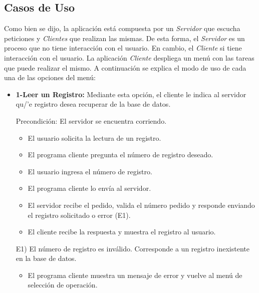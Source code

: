 \documentclass[a4paper,10pt]{article}
\begin{document}
			\subsection{Casos de Uso}

			Como bien se dijo, la aplicaci\'on est\'a compuesta por un \emph{Servidor} que escucha peticiones y \emph{Clientes} que realizan las mismas. 
			De esta forma, el \emph{Servidor} es un proceso que no tiene interacci\'on con el usuario. En cambio, el \emph{Cliente} si tiene interacci\'on
			con el usuario. La aplicaci\'on \emph{Cliente} despliega un men\'u con las tareas que puede realizar el mismo. A continuaci\'on se 
			explica el modo de uso de cada una de las opciones del men\'u: 

			\begin{itemize}
                                
                \item \textbf{1-Leer un Registro:} Mediante esta opci\'on, el cliente le indica al servidor qu/'e registro desea recuperar de la base de datos.

                Precondici\'on: El servidor se encuentra corriendo. 
                \begin{itemize}
                    \item El usuario solicita la lectura de un registro. 
                    \item El programa cliente pregunta el n\'umero de registro deseado. 
		    \item El usuario ingresa el n\'umero de registro. 
                    \item El programa cliente lo env\'ia al servidor.
                    \item El servidor recibe el pedido, valida el n\'umero pedido y responde enviando el registro solicitado o error (E1). 
		    \item El cliente recibe la respuesta y muestra el registro al usuario.
                \end{itemize}
                
                E1) El n\'umero de registro es inv\'alido. Corresponde a un registro inexistente en la base de datos. 
                    \begin{itemize}
                        \item El programa cliente muestra un mensaje de error y vuelve al men\'u de selecci\'on de operaci\'on.
				    \end{itemize}
                

\end{itemize}
\end{document}
